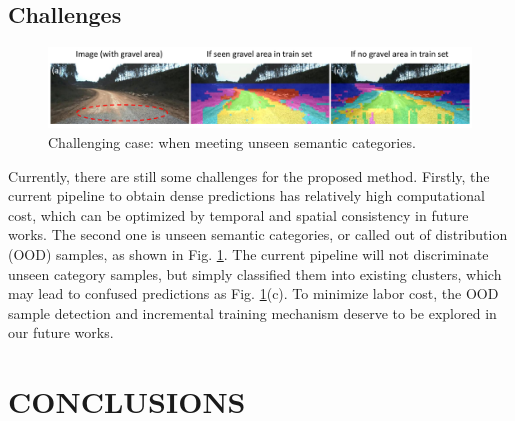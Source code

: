\documentclass[letterpaper, 10 pt, conference]{ieeeconf}  %
\begin{document}
\subsection{Challenges}
\begin{figure}[]
	\centering
	\includegraphics[width=\textwidth]{challenges.pdf}
	\caption{Challenging case: when meeting unseen semantic categories.}
	\label{fig:challenges}
\end{figure}
Currently, there are still some challenges for the proposed method. Firstly, the current pipeline to obtain dense predictions has relatively high computational cost, which can be optimized by temporal and spatial consistency in future works.
The second one is unseen semantic categories, or called out of distribution (OOD) samples, as shown in Fig. \ref{fig:challenges}. The current pipeline will not discriminate unseen category samples, but simply classified them into existing clusters, which may lead to confused predictions as Fig. \ref{fig:challenges}(c). To minimize labor cost, the OOD sample detection and incremental training mechanism deserve to be explored in our future works.



\section{CONCLUSIONS}	\label{conclusions}

\addtolength{\textheight}{-12cm}   %
\end{document}
